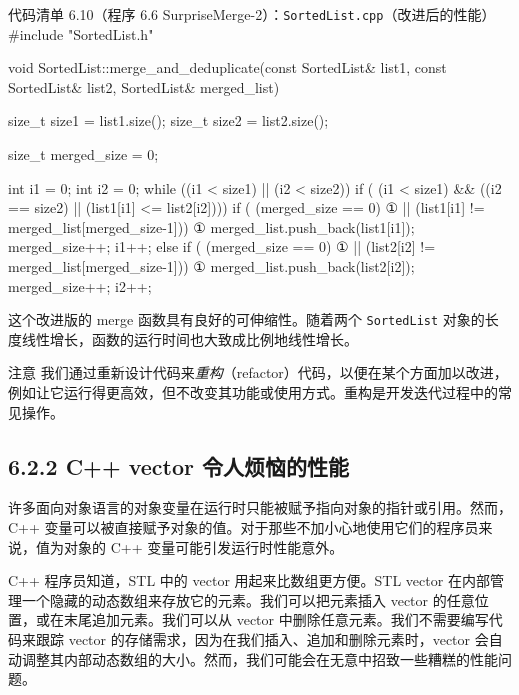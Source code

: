 \begin{codeboxt}{代码清单 6.10（程序 6.6 SurpriseMerge-2）：\texttt{Sorted\allowbreak{}List.\allowbreak{}cpp}（改进后的性能）}
#include "SortedList.h"

void SortedList::merge_and_deduplicate(const SortedList& list1,
                                       const SortedList& list2,
                                             SortedList& merged_list)
{
    size_t size1 = list1.size();
    size_t size2 = list2.size();

    size_t merged_size = 0;

    int i1 = 0;
    int i2 = 0;
    while ((i1 < size1) || (i2 < size2))
    {
        if (   (i1 < size1)
            && ((i2 == size2) || (list1[i1] <= list2[i2])))
        {
            if (   (merged_size == 0)                         ①
                || (list1[i1] != merged_list[merged_size-1])) ①
            {
                merged_list.push_back(list1[i1]);
                merged_size++;
            }
            i1++;
        }
        else
        {
            if (   (merged_size == 0)                         ①
                || (list2[i2] != merged_list[merged_size-1])) ① 
            {
                merged_list.push_back(list2[i2]);
                merged_size++;
            }
            i2++;
        }
    }
}
\end{codeboxt}
\par

这个改进版的 merge 函数具有良好的可伸缩性。随着两个 \texttt{Sorted\allowbreak{}List} 对象的长度线性增长，函数的运行时间也大致成比例地线性增长。

\begin{myWarning}{注意}
我们通过重新设计代码来\emph{重构}（refactor）代码，以便在某个方面加以改进，例如让它运行得更高效，但不改变其功能或使用方式。重构是开发迭代过程中的常见操作。
\end{myWarning}

\subsection{6.2.2 C++ vector 令人烦恼的性能}

许多面向对象语言的对象变量在运行时只能被赋予指向对象的指针或引用。然而，C++ 变量可以被直接赋予对象的值。对于那些不加小心地使用它们的程序员来说，值为对象的 C++ 变量可能引发运行时性能意外。

C++ 程序员知道，STL 中的 vector 用起来比数组更方便。STL vector 在内部管理一个隐藏的动态数组来存放它的元素。我们可以把元素插入 vector 的任意位置，或在末尾追加元素。我们可以从 vector 中删除任意元素。我们不需要编写代码来跟踪 vector 的存储需求，因为在我们插入、追加和删除元素时，vector 会自动调整其内部动态数组的大小。然而，我们可能会在无意中招致一些糟糕的性能问题。

